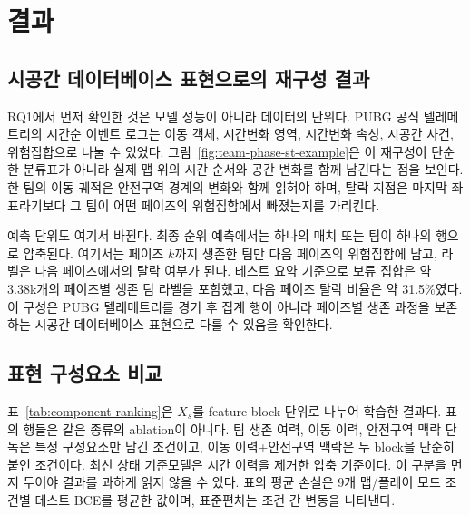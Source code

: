 \section{결과}
\label{sec:results}

\subsection{시공간 데이터베이스 표현으로의 재구성 결과}

RQ1에서 먼저 확인한 것은 모델 성능이 아니라 데이터의 단위다. PUBG 공식
텔레메트리의 시간순 이벤트 로그는 이동 객체, 시간변화 영역, 시간변화 속성, 시공간
사건, 위험집합으로 나눌 수 있었다. 그림~\ref{fig:team-phase-st-example}은
이 재구성이 단순한 분류표가 아니라 실제 맵 위의 시간 순서와 공간 변화를 함께
남긴다는 점을 보인다. 한 팀의 이동 궤적은 안전구역 경계의 변화와 함께 읽혀야 하며,
탈락 지점은 마지막 좌표라기보다 그 팀이 어떤 페이즈의 위험집합에서 빠졌는지를
가리킨다.

예측 단위도 여기서 바뀐다. 최종 순위 예측에서는 하나의 매치 또는 팀이 하나의 행으로
압축된다. 여기서는 페이즈 \(k\)까지 생존한 팀만 다음 페이즈의 위험집합에 남고,
라벨은 다음 페이즈에서의 탈락 여부가 된다. 테스트 요약 기준으로 보류 집합은 약
3.38k개의 페이즈별 생존 팀 라벨을 포함했고, 다음 페이즈 탈락 비율은 약
31.5\%였다. 이 구성은 PUBG 텔레메트리를 경기 후 집계 행이 아니라 페이즈별 생존
과정을 보존하는 시공간 데이터베이스 표현으로 다룰 수 있음을 확인한다.

\subsection{표현 구성요소 비교}

표~\ref{tab:component-ranking}은 \(X_s\)를 feature block 단위로 나누어 학습한 결과다.
표의 행들은 같은 종류의 ablation이 아니다. 팀 생존 여력, 이동 이력, 안전구역 맥락
단독은 특정 구성요소만 남긴 조건이고, 이동 이력+안전구역 맥락은 두 block을 단순히
붙인 조건이다. 최신 상태 기준모델은 시간 이력을 제거한 압축 기준이다. 이 구분을
먼저 두어야 결과를 과하게 읽지 않을 수 있다. 표의 평균 손실은 9개 맵/플레이 모드
조건별 테스트 BCE를 평균한 값이며, 표준편차는 조건 간 변동을 나타낸다.

